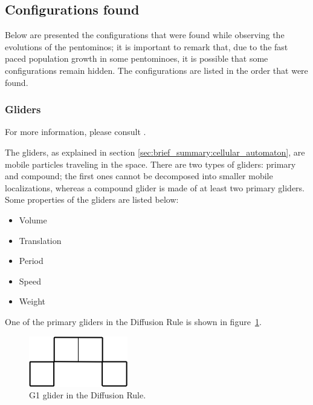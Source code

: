 
\newpage
\subsection{Configurations found}
Below are presented the configurations that were found while observing the
evolutions of the pentominos; it is important to remark that, due to the
fast paced population growth in some pentominoes, it is possible that some
configurations remain hidden. The configurations are listed in the order that
were found.

\subsubsection{Gliders}

For more information, please consult \cite{j2}.

The gliders, as explained in section \ref{sec:brief_summary:cellular_automaton},
are mobile particles traveling in the space. There are two types of gliders:
primary and compound; the first ones cannot be decomposed into smaller mobile
localizations, whereas a compound glider is made of at least two primary
gliders. Some properties of the gliders are listed below:
\begin{itemize}
  \item Volume
  \item Translation
  \item Period
  \item Speed
  \item Weight
\end{itemize}

One of the primary gliders in the Diffusion Rule is shown in
figure~\ref{fig:dr-glider-1}.

\begin{figure}
	\centering
	\includegraphics[scale=0.5]{df_settings_dd/dr-glider-1.png}
	\caption{G1 glider in the Diffusion Rule.}
  \label{fig:dr-glider-1}
\end{figure}

